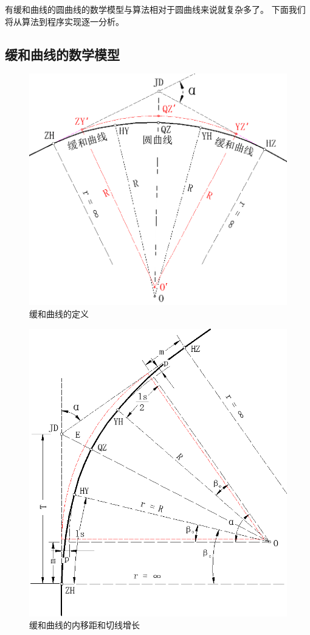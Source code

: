 有缓和曲线的圆曲线的数学模型与算法相对于圆曲线来说就复杂多了。
下面我们将从算法到程序实现逐一分析。

\subsection{缓和曲线的数学模型}

 \begin{figure}[htbp]
    \centering
    \includegraphics[scale=0.6]{chapter/route/HY01.png}
    \caption{缓和曲线的定义}
    \label{fig:HR01}
\end{figure}


\begin{figure}[htbp]
    \centering
    \includegraphics[scale=0.6]{chapter/route/HY02.png}
    \caption{缓和曲线的内移距和切线增长}
    \label{fig:HY02}
\end{figure}


